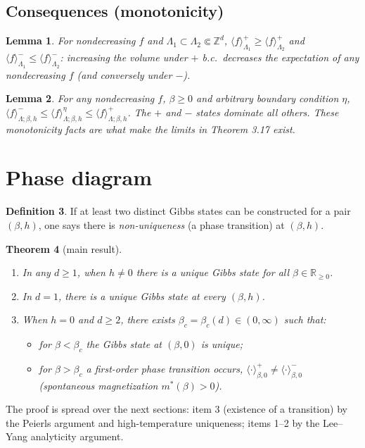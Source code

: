 \documentclass[11pt]{article}
\theoremstyle{plain}
\newtheorem{theorem}{Theorem}
\newtheorem{lemma}[theorem]{Lemma}
\theoremstyle{definition}
\newtheorem{definition}[theorem]{Definition}
\theoremstyle{remark}
\newcommand{\Z}{\mathbb{Z}}
\newcommand{\R}{\mathbb{R}}
\newcommand{\Rgeq}{\R_{\ge 0}}
\newcommand{\fin}{\Subset}          %
\newcommand{\La}{\Lambda}
\newcommand{\avg}[1]{\langle #1 \rangle}
\newcommand{\meanp}[1]{\langle #1 \rangle^{+}}
\newcommand{\meanm}[1]{\langle #1 \rangle^{-}}
\begin{document}
\subsection{Consequences (monotonicity)}
\begin{lemma}
For nondecreasing $f$ and $\La_1\subset\La_2\fin\Z^d$,
$\avg{f}^{+}_{\La_1}\ge\avg{f}^{+}_{\La_2}$ and
$\avg{f}^{-}_{\La_1}\le\avg{f}^{-}_{\La_2}$: increasing the volume under $+$
b.c.\ decreases the expectation of any nondecreasing $f$ (and conversely under
$-$).
\end{lemma}

\begin{lemma}
For any nondecreasing $f$, $\beta\ge0$ and arbitrary boundary condition $\eta$,
$\meanm{f}_{\La;\beta,h}\le\avg{f}^{\eta}_{\La;\beta,h}\le\meanp{f}_{\La;\beta,h}$.
The $+$ and $-$ states dominate all others. These monotonicity facts are what
make the limits in Theorem 3.17 exist.
\end{lemma}

\section{Phase diagram}
\begin{definition}
If at least two distinct Gibbs states can be constructed for a pair
$(\beta,h)$, one says there is \emph{non-uniqueness} (a phase transition) at
$(\beta,h)$.
\end{definition}

\begin{theorem}[main result]\leavevmode
\begin{enumerate}
  \item In any $d\ge1$, when $h\neq0$ there is a \emph{unique} Gibbs state for
        all $\beta\in\Rgeq$.
  \item In $d=1$, there is a unique Gibbs state at every $(\beta,h)$.
  \item When $h=0$ and $d\ge2$, there exists
        $\beta_c=\beta_c(d)\in(0,\infty)$ such that:
        \begin{itemize}
          \item for $\beta<\beta_c$ the Gibbs state at $(\beta,0)$ is unique;
          \item for $\beta>\beta_c$ a first-order phase transition occurs,
                $\meanp{\cdot}_{\beta,0}\neq\meanm{\cdot}_{\beta,0}$
                (spontaneous magnetization $m^*(\beta)>0$).
        \end{itemize}
\end{enumerate}
\end{theorem}
\noindent The proof is spread over the next sections: item 3 (existence of a
transition) by the Peierls argument and high-temperature uniqueness; items 1--2
by the Lee--Yang analyticity argument.
\end{document}
